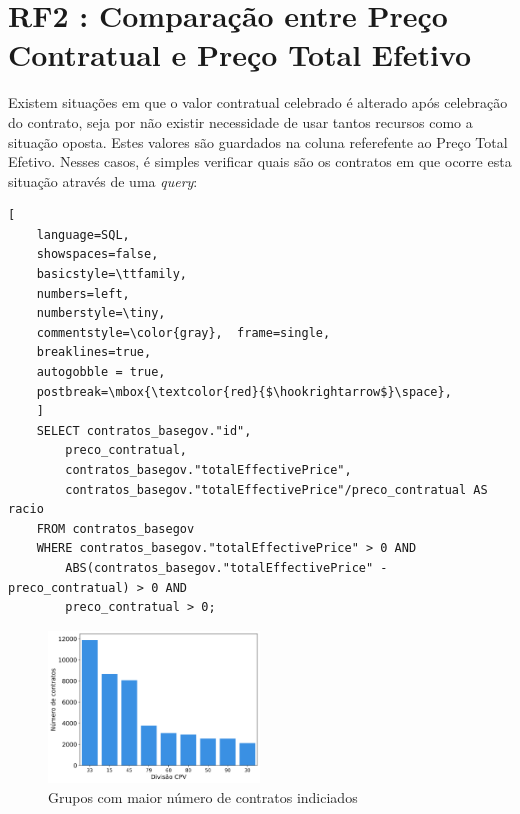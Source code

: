 %



\section{RF2 : Comparação entre Preço Contratual e Preço Total Efetivo}

Existem situações em que o valor contratual celebrado é alterado após celebração do contrato, seja por não existir necessidade de usar tantos recursos como a situação oposta. Estes valores são guardados na coluna referefente ao Preço Total Efetivo. Nesses casos, é simples verificar quais são os contratos em que ocorre esta situação através de uma \textit{query}: 

\begin{lstlisting}[
	language=SQL,
	showspaces=false,
	basicstyle=\ttfamily,
	numbers=left,
	numberstyle=\tiny,
	commentstyle=\color{gray},	frame=single,
	breaklines=true,
	autogobble = true,
	postbreak=\mbox{\textcolor{red}{$\hookrightarrow$}\space},
	]
	SELECT contratos_basegov."id", 
		preco_contratual, 
		contratos_basegov."totalEffectivePrice", 
		contratos_basegov."totalEffectivePrice"/preco_contratual AS racio
	FROM contratos_basegov 
	WHERE contratos_basegov."totalEffectivePrice" > 0 AND 
		ABS(contratos_basegov."totalEffectivePrice" - preco_contratual) > 0 AND 
		preco_contratual > 0;
\end{lstlisting}


\begin{figure}[H]
	\centering
	\includegraphics[width=0.5\textwidth]{imagens/rf2/main_cpvs.png}
	\caption{Grupos com maior número de contratos indiciados}
	\label{}
\end{figure}



